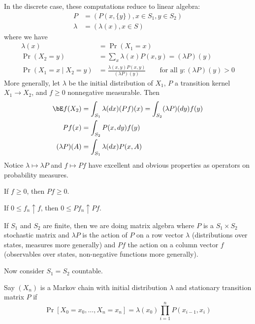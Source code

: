 In the discrete case, these computations reduce to linear algebra:
\begin{align}
  P &= (P(x,\{y\}), x \in S_1, y \in S_2) \\
  \lambda &= (\lambda(x), x \in S)
\end{align}
where we have
\begin{align}
  \lambda(x) &= \Pr(X_1 = x) \\
  \Pr(X_2 = y) &= \sum_x \lambda(x) P(x, y) = (\lambda P)(y) \\
  \Pr(X_1 = x \mid X_2 = y) &= \frac{\lambda(x, y) P(x, y)}{(\lambda P)(y)}
  \qquad\text{for all $y : (\lambda P)(y) > 0$}
\end{align}
More generally, let $\lambda$ be the initial distribution of $X_1$,
$P$ a transition kernel $X_1 \to X_2$,
and $f \geq 0$ nonnegative measurable. Then
\begin{align*}
  \bE f(X_2) &= \int_{S_1} \lambda(dx) (P f)(x) = \int_{S_2} (\lambda P)(dy) f(y) \\
  P f(x) &= \int_{S_2} P(x, dy) f(y) \\
  (\lambda P)(A) &= \int_{S_1} \lambda(d x) P(x, A)
\end{align*}
Notice $\lambda \mapsto \lambda P$ and $f \mapsto P f$ have excellent
and obvious properties as operators on probability measures.

\begin{example}
  If $f \geq 0$, then $P f \geq 0$.

  If $0 \leq f_n \uparrow f$, then $0 \leq P f_n \uparrow P f$.
\end{example}

If $S_1$ and $S_2$ are finite, then we are doing matrix algebra where
$P$ is a $S_1 \times S_2$ stochastic matrix and
$\lambda P$ is the action of $P$ on a row vector $\lambda$ (distributions
over states, measures more generally)
and $P f$ the action on a column vector $f$ (observables over states,
non-negative functions more generally).

Now consider $S_1 = S_2$ countable.
\begin{definition}
  Say $(X_n)$ is a Markov chain with initial distribution
  $\lambda$ and stationary transition matrix $P$ if
  \[
    \Pr[X_0 = x_0, \ldots, X_n = x_n]
    = \lambda(x_0) \prod_{i=1}^n P(x_{i-1}, x_i)
  \]
\end{definition}
